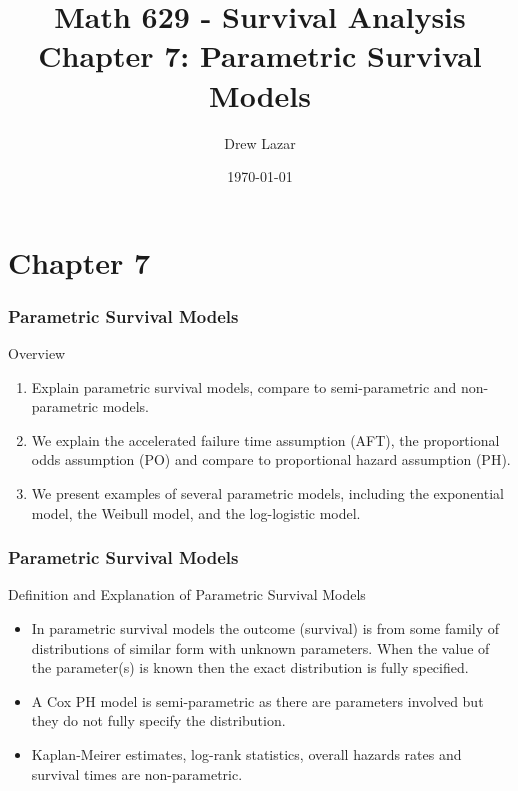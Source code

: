 \documentclass{beamer}
\title{Math 629 - Survival Analysis \\ Chapter 7: Parametric Survival Models
}
\author{Drew Lazar}
\institute{Ball State University}
\date{\today}
\theoremstyle{definition}
\begin{document}
\begin{frame}
    \titlepage
\end{frame}



\section{Chapter 7}
\begin{frame}
\frametitle{Parametric Survival Models}
\begin{block}{Overview}
\begin{enumerate}
\item Explain parametric survival models, compare to semi-parametric and non-parametric models.
\item We explain the accelerated failure time assumption (AFT), the proportional odds assumption (PO) and compare to proportional hazard assumption (PH).
\item We present examples of several parametric models, including the exponential model, the Weibull model, and the
log-logistic model.
\end{enumerate}
\end{block}
\end{frame}

\begin{frame}
\frametitle{Parametric Survival Models}
\begin{block}{Definition and Explanation of Parametric Survival Models}
\begin{itemize}
\item In parametric survival models the outcome (survival) is from some family of
distributions of similar form with unknown parameters. When the value of the parameter(s) is known then the exact distribution
is fully specified.
\item A Cox PH model is semi-parametric as there are parameters involved but they do not fully specify the distribution.
\item Kaplan-Meirer estimates, log-rank statistics, overall hazards rates and survival times are non-parametric.
\end{itemize}
\end{block}
\end{frame}
\end{document}
